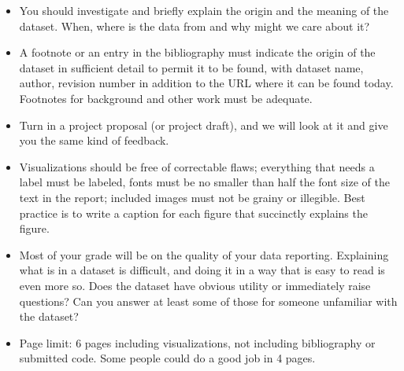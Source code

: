 \documentclass[]{book}
\theoremstyle{definition}
\begin{document}
\begin{enumerate}
\begin{itemize}
\item  You should investigate and briefly explain the origin and the meaning of the dataset.  When, where is the data from and why might we care about it?  

\item A footnote or an entry in the bibliography must indicate the origin of the dataset in sufficient detail to permit it to be found, with dataset name, author, revision number in addition to the URL where it can be found today.  Footnotes for background and other work must be adequate. 

\item Turn in a project proposal (or project draft), and we will look at it and give you the same kind of feedback.  




\item Visualizations should be free of correctable flaws; everything that needs a label must be labeled, fonts must be no smaller than half the font size of the text in the report; included images must not be grainy or illegible.  Best practice is to write a caption for each figure that succinctly explains the figure.

\item Most of your grade will be on the quality of your data reporting. Explaining what is in a dataset is difficult, and doing it in a way that is easy to read is even more so.  Does the dataset have obvious utility or immediately raise questions?  Can you answer at least some of those for someone unfamiliar with the dataset?

\item Page limit: 6 pages including visualizations, not including bibliography or submitted code.  Some people could do a good job in 4 pages.


\end{itemize}
\end{enumerate}
\end{document}
